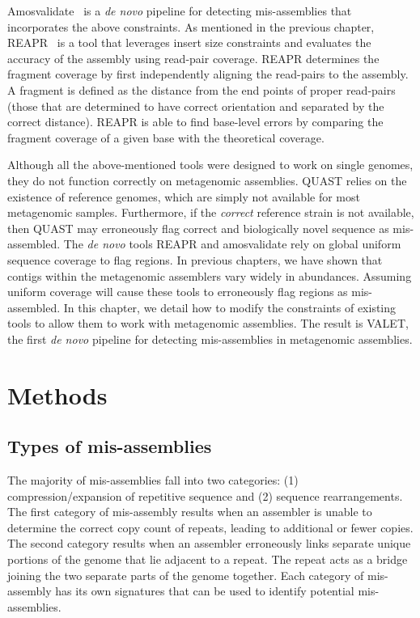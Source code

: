 \documentclass{bioinfo}
\begin{document}
Amosvalidate~\citep{amosvalidate2008} is a \emph{de novo} pipeline for detecting mis-assemblies that incorporates the above constraints.
As mentioned in the previous chapter, REAPR~\citep{hunt2013reapr} is a tool that leverages insert size constraints and evaluates the accuracy of the assembly using read-pair coverage.
REAPR determines the fragment coverage by first independently aligning the read-pairs to the assembly.
A fragment is defined as the distance from the end points of proper read-pairs (those that are determined to have correct orientation and separated by the correct distance).
REAPR is able to find base-level errors by comparing the fragment coverage of a given base with the theoretical coverage.

Although all the above-mentioned tools were designed to work on single genomes, they do not function correctly on metagenomic assemblies.
QUAST relies on the existence of reference genomes, which are simply not available for most metagenomic samples.
Furthermore, if the \emph{correct} reference strain is not available, then QUAST may erroneously flag correct and biologically novel sequence as mis-assembled.
The \emph{de novo} tools REAPR and amosvalidate rely on global uniform sequence coverage to flag regions.
In previous chapters, we have shown that contigs within the metagenomic assemblers vary widely in abundances.
Assuming uniform coverage will cause these tools to erroneously flag regions as mis-assembled.
In this chapter, we detail how to modify the constraints of existing tools to allow them to work with metagenomic assemblies.
The result is VALET, the first \emph{de novo} pipeline for detecting mis-assemblies in metagenomic assemblies.

\section{Methods}

\subsection{Types of mis-assemblies}

The majority of mis-assemblies fall into two categories: (1) compression/expansion of repetitive sequence and (2) sequence rearrangements.
The first category of mis-assembly results when an assembler is unable to determine the correct copy count of repeats, leading to additional or fewer copies.
The second category results when an assembler erroneously links separate unique portions of the genome that lie adjacent to a repeat.
The repeat acts as a bridge joining the two separate parts of the genome together.
Each category of mis-assembly has its own signatures that can be used to identify potential mis-assemblies.
\end{document}
